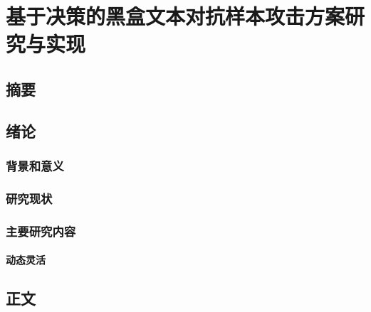 \documentclass[
]{article}
\author{}
\date{}
\begin{document}
\hypertarget{ux57faux4e8eux51b3ux7b56ux7684ux9ed1ux76d2ux6587ux672cux5bf9ux6297ux6837ux672cux653bux51fbux65b9ux6848ux7814ux7a76ux4e0eux5b9eux73b0}{%
\section{\texorpdfstring{\textbf{基于决策的黑盒文本对抗样本攻击方案研究与实现}}{基于决策的黑盒文本对抗样本攻击方案研究与实现}}\label{ux57faux4e8eux51b3ux7b56ux7684ux9ed1ux76d2ux6587ux672cux5bf9ux6297ux6837ux672cux653bux51fbux65b9ux6848ux7814ux7a76ux4e0eux5b9eux73b0}}

\hypertarget{ux6458ux8981}{%
\subsection{摘要}\label{ux6458ux8981}}

\hypertarget{ux7eeaux8bba}{%
\subsection{绪论}\label{ux7eeaux8bba}}

\hypertarget{ux80ccux666fux548cux610fux4e49}{%
\subsubsection{背景和意义}\label{ux80ccux666fux548cux610fux4e49}}

\hypertarget{ux7814ux7a76ux73b0ux72b6}{%
\subsubsection{研究现状}\label{ux7814ux7a76ux73b0ux72b6}}

\hypertarget{ux4e3bux8981ux7814ux7a76ux5185ux5bb9}{%
\subsubsection{主要研究内容}\label{ux4e3bux8981ux7814ux7a76ux5185ux5bb9}}

\hypertarget{ux52a8ux6001ux7075ux6d3b}{%
\paragraph{动态灵活}\label{ux52a8ux6001ux7075ux6d3b}}

\hypertarget{ux6b63ux6587}{%
\subsection{正文}\label{ux6b63ux6587}}
\end{document}
